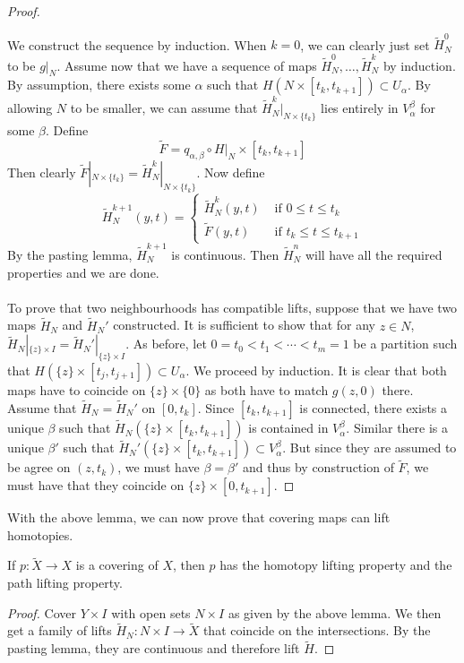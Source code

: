 \documentclass[a4paper]{article}
\begin{document}
\begin{lmm}{}{}
\begin{proof}
\begin{itemize}
\end{itemize}
We construct the sequence by induction. When $k=0$, we can clearly just set $\tilde{H}_N^0$ to be $g|_N$. Assume now that we have a sequence of maps $\tilde{H}_N^0,\dots,\tilde{H}_N^k$ by induction. By assumption, there exists some $\alpha$ such that $H(N\times[t_k,t_{k+1}])\subset U_\alpha$. By allowing $N$ to be smaller, we can assume that $\tilde{H}_N^k|_{N\times\{t_k\}}$ lies entirely in $V_\alpha^\beta$ for some $\beta$. Define $$\tilde{F}=q_{\alpha,\beta}\circ H|_N\times[t_k,t_{k+1}]$$ Then clearly $\tilde{F}|_{N\times\{t_k\}}=\tilde{H}_N^k|_{N\times\{t_k\}}$. Now define $$\tilde{H}_N^{k+1}(y,t)=\begin{cases}
\tilde{H}_N^k(y,t) & \text{ if }0\leq t\leq t_k\\
\tilde{F}(y,t) & \text{ if } t_k\leq t\leq t_{k+1}
\end{cases}$$
By the pasting lemma, $\tilde{H}_N^{k+1}$ is continuous. Then $\tilde{H}_N^n$ will have all the required properties and we are done. \\~\\
To prove that two neighbourhoods has compatible lifts, suppose that we have two maps $\tilde{H}_N$ and $\tilde{H}_N'$ constructed. It is sufficient to show that for any $z\in N$, $\tilde{H}_N|_{\{z\}\times I}=\tilde{H}_N'|_{\{z\}\times I}$. As before, let $0=t_0<t_1<\cdots<t_m=1$ be a partition such that $H(\{z\}\times[t_j,t_{j+1}])\subset U_\alpha$. We proceed by induction. It is clear that both maps have to coincide on $\{z\}\times\{0\}$ as both have to match $g(z,0)$ there. Assume that $\tilde{H}_N=\tilde{H}_N'$ on $[0,t_k]$. Since $[t_k,t_{k+1}]$ is connected, there exists a unique $\beta$ such that $\tilde{H}_N(\{z\}\times[t_k,t_{k+1}])$ is contained in $V_\alpha^\beta$. Similar there is a unique $\beta'$ such that $\tilde{H}_N'(\{z\}\times[t_k,t_{k+1}])\subset V_\alpha^\beta$. But since they are assumed to be agree on $(z,t_k)$, we must have $\beta=\beta'$ and thus by construction of $\tilde{F}$, we must have that they coincide on $\{z\}\times[0,t_{k+1}]$. 
\end{proof}
\end{lmm}

With the above lemma, we can now prove that covering maps can lift homotopies. 

\begin{thm}{}{} If $p:\tilde{X}\to X$ is a covering of $X$, then $p$ has the homotopy lifting property and the path lifting property. \tcbline
\begin{proof}
Cover $Y\times I$ with open sets $N\times I$ as given by the above lemma. We then get a family of lifts $\tilde{H}_N:N\times I\to\tilde{X}$ that coincide on the intersections. By the pasting lemma, they are continuous and therefore lift $\tilde{H}$. 
\end{proof}
\end{thm}
\end{document}
